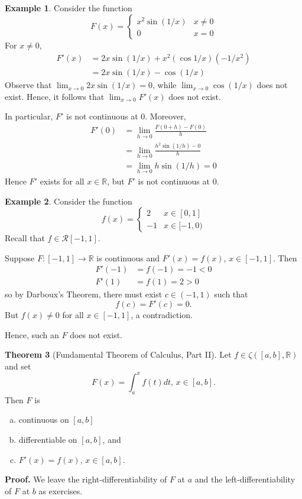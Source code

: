 \documentclass[11pt]{article}
\theoremstyle{definition}
\newtheorem{thm}{Theorem}[section]
\newtheorem{exmp}[thm]{Example}
\newcommand{\mbR}{\ensuremath{\mathbb{R}}}
\begin{document}
\begin{exmp}
Consider the function 
$$F(x) = \begin{cases} x^2 \sin (1/x) & x \ne 0 \\ 0 & x = 0 \end{cases}$$
For $x \ne 0$,
\begin{align*}
F'(x) & = 2x \sin( 1/x) + x^2(\cos 1/x)(-1/x^2) \\
& = 2x \sin (1/x) - \cos (1/x)
\end{align*}
Observe that $\lim_{x\to0} 2x\sin( 1/x) = 0$, while $\lim_{x\to0} \cos (1/x)$ does not exist. Hence, it follows that $\lim_{x\to0} F'(x)$ does not exist. 

In particular, $F'$ is not continuous at 0. Moreover,
\begin{align*}
F'(0) & = \lim_{h\to0} \frac{F(0+h) - F(0)}h \\
& = \lim_{h\to0} \frac{h^2 \sin(1/h) - 0}h \\
& = \lim_{h\to0} h\sin(1/h) = 0
\end{align*}
Hence $F'$ exists for all $x \in \mbR$, but $F'$ is not continuous at 0.
\end{exmp}

\begin{exmp}
Consider the function
$$f(x) = \begin{cases} 2 & x \in [0, 1] \\ -1 & x \in [-1, 0) \end{cases}$$
Recall that $f \in \mathcal{R}[-1, 1]$. 

Suppose $F : [-1, 1] \to \mbR$ is continuous and $F'(x) = f(x)$, $x \in [-1, 1]$. Then
\begin{align*}
F'(-1) & = f(-1) = -1 < 0 \\
F'(1) & = f(1) = 2 > 0
\end{align*}
so by Darboux's Theorem, there must exist $c \in (-1, 1)$ such that $$f(c) = F'(c) = 0 \text{.}$$
But $f(x) \ne 0$ for all $x \in [-1, 1]$, a contradiction. 

Hence, such an $F$ does not exist.
\end{exmp}

\begin{thm}[Fundamental Theorem of Calculus, Part II]
Let $f \in \zeta([a, b], \mbR)$ and set
$$F(x) = \int_a^x f(t)dt, \hspace{2pt} x \in [a, b] \text{.}$$
Then $F$ is
\begin{enumerate}[(a)] \vspace{-0.2cm}
\item continuous on $[a, b]$ 
\item differentiable on $[a, b]$, and
\item $F'(x) = f(x)$, $x \in [a, b]$.
\end{enumerate}
\end{thm}
\textbf{Proof.} We leave the right-differentiability of $F$ at $a$ and the left-differentiability of $F$ at $b$ as exercises. 
\end{document}
